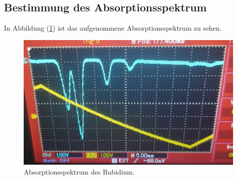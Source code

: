 \subsection{Bestimmung des Absorptionsspektrum}
In Abbildung (\ref{fig:mess4}) ist das aufgenommene Absorptionsspektrum zu sehen.
\begin{figure}[h!]
  \centering
  \includegraphics[scale=0.15]{fig/spektrum.jpeg}
  \caption{Absorptionsspektrum des Rubidium.}
  \label{fig:mess4}
\end{figure}



